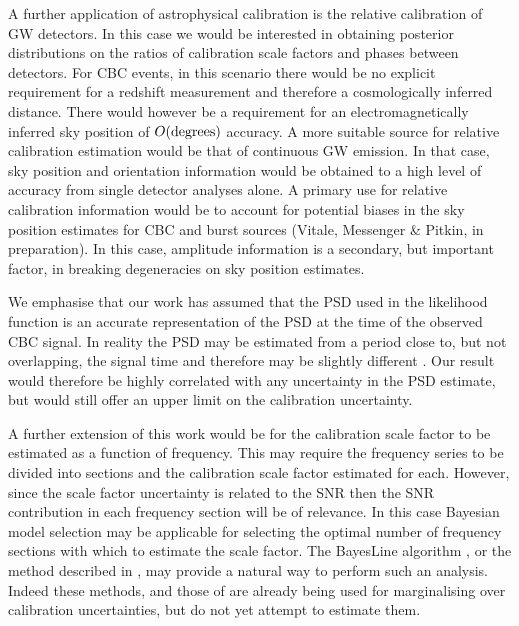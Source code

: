\documentclass[prd, twocolumn, lengthcheck, superscriptaddress, showpacs, letterpaper, nofootinbib]{revtex4-1}
\begin{document}
A further application of astrophysical calibration is the relative calibration
of \ac{GW} detectors.  In this case we would be interested in obtaining
posterior distributions on the ratios of calibration scale factors and phases between
detectors. For \ac{CBC} events, in this scenario there would be no explicit
requirement for a redshift measurement and therefore a cosmologically inferred
distance. There would however be a requirement for an electromagnetically
inferred sky position of $O(\rm{degrees})$ accuracy. A more suitable source for
relative calibration estimation would be that of continuous \ac{GW} emission.
In that case, sky position and orientation information would be obtained to a
high level of accuracy from single detector analyses alone. A primary use for
relative calibration information would be to account for potential biases in
the sky position estimates for \ac{CBC} and burst sources (Vitale, Messenger \& Pitkin, in preparation). In this case,
amplitude information is a secondary, but important factor, in breaking
degeneracies on sky position estimates.    

We emphasise that our work has assumed that the \ac{PSD} used in the likelihood
function is an accurate representation of the \ac{PSD} at the time of the
observed \ac{CBC} signal. In reality the \ac{PSD} may be estimated from a
period close to, but not overlapping, the signal time and therefore may be
slightly different \cite{2013PhRvD..88h4044L}. Our result would therefore be
highly correlated with any uncertainty in the \ac{PSD} estimate, but would
still offer an upper limit on the calibration uncertainty. 

A further extension of this work would be for the calibration scale factor to
be estimated as a function of frequency. This may require the frequency series
to be divided into sections and the calibration scale factor estimated for
each. However, since the scale factor uncertainty is related to the \ac{SNR}
then the \ac{SNR} contribution in each frequency section will be of relevance.
In this case Bayesian model selection may be applicable for selecting the
optimal number of frequency sections with which to estimate the scale factor.
The BayesLine algorithm \cite{2015PhRvD..91h4034L}, or the method described in
\cite{2013PhRvD..88h4044L}, may provide a natural way to perform such an
analysis. Indeed these methods, and those of \cite{Vitale:2012} are already
being used for marginalising over calibration uncertainties, but do not yet
attempt to estimate them.
\end{document}
